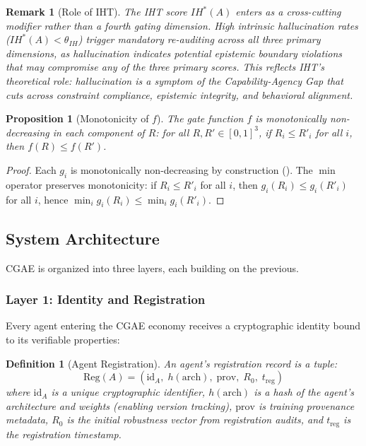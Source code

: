 \documentclass[11pt,a4paper]{article}
\newtheorem{proposition}[theorem]{Proposition}
\newtheorem{definition}{Definition}
\newtheorem{remark}{Remark}
\begin{document}
\begin{remark}[Role of IHT]
The IHT score $IH^*(A)$ enters as a \emph{cross-cutting modifier} rather than a fourth gating dimension. High intrinsic hallucination rates ($IH^*(A) < \theta_{IH}$) trigger mandatory re-auditing across all three primary dimensions, as hallucination indicates potential epistemic boundary violations that may compromise any of the three primary scores. This reflects IHT's theoretical role: hallucination is a symptom of the Capability-Agency Gap that cuts across constraint compliance, epistemic integrity, and behavioral alignment.
\end{remark}

\begin{proposition}[Monotonicity of $f$]
\label{prop:mono}
The gate function $f$ is monotonically non-decreasing in each component of $R$: for all $R, R' \in [0,1]^3$, if $R_i \leq R'_i$ for all $i$, then $f(R) \leq f(R')$.
\end{proposition}

\begin{proof}
Each $g_i$ is monotonically non-decreasing by construction (). The $\min$ operator preserves monotonicity: if $R_i \leq R'_i$ for all $i$, then $g_i(R_i) \leq g_i(R'_i)$ for all $i$, hence $\min_i g_i(R_i) \leq \min_i g_i(R'_i)$.
\end{proof}

\subsection{System Architecture}

CGAE is organized into three layers, each building on the previous.

\subsubsection{Layer 1: Identity and Registration}

Every agent entering the CGAE economy receives a cryptographic identity bound to its verifiable properties:

\begin{definition}[Agent Registration]
An agent's \emph{registration record} is a tuple:
\begin{equation}
  \text{Reg}(A) = (\text{id}_A, \; h(\text{arch}), \; \text{prov}, \; R_0, \; t_{\text{reg}})
\end{equation}
where $\text{id}_A$ is a unique cryptographic identifier, $h(\text{arch})$ is a hash of the agent's architecture and weights (enabling version tracking), $\text{prov}$ is training provenance metadata, $R_0$ is the initial robustness vector from registration audits, and $t_{\text{reg}}$ is the registration timestamp.
\end{definition}
\end{document}
